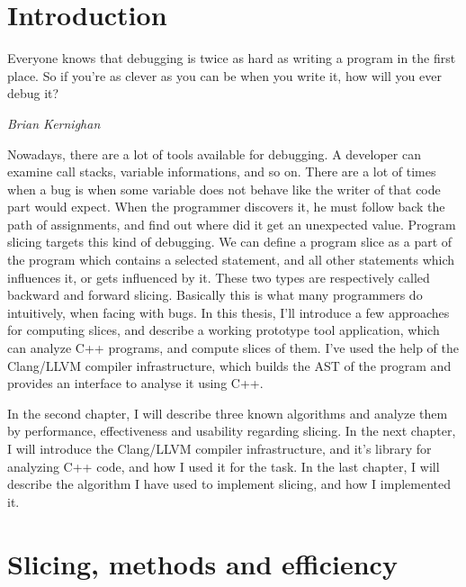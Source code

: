 \documentclass[oneside,12pt,a4paper]{book}
\begin{document}
\chapter{Introduction}
\epigraph{Everyone knows that debugging is twice as hard as writing a program in the first place. So if you're as clever as you can be when you write it, how will you ever debug it?}{\textit{Brian Kernighan}}

Nowadays, there are a lot of tools available for debugging. A developer can examine call stacks, variable informations, and so on. There are a lot of times when a bug is when some variable does not behave like the writer of that code part would expect. When the programmer discovers it, he must follow back the path of assignments, and find out where did it get an unexpected value. Program slicing targets this kind of debugging. We can define a program slice as a part of the program which contains a selected statement, and all other statements which influences it, or gets influenced by it. These two types are respectively called backward and forward slicing. Basically this is what many programmers do intuitively, when facing with bugs. In this thesis, I'll introduce a few approaches for computing slices, and describe a working prototype tool application, which can analyze C++ programs, and compute slices of them. I've used the help of the Clang/LLVM compiler infrastructure, which builds the AST of the program and provides an interface to analyse it using C++.

In the second chapter, I will describe three known algorithms and analyze them by performance, effectiveness and usability regarding slicing. In the next chapter, I will introduce the Clang/LLVM compiler infrastructure, and it's library for analyzing C++ code, and how I used it for the task. In the last chapter, I will describe the algorithm I have used to implement slicing, and how I implemented it.

\chapter{Slicing, methods and efficiency}
\end{document}
